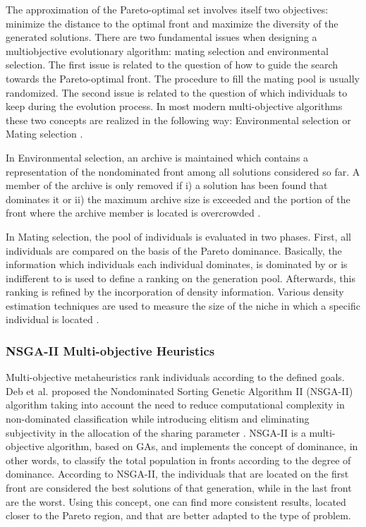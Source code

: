 \documentclass[espaco=umemeio,chapter=TITLE,twoside,openright]{abnt}
\begin{document}
The approximation of the Pareto-optimal set involves itself two objectives: minimize the distance to the optimal front and maximize the diversity of the generated solutions. There are two fundamental issues when designing a multiobjective evolutionary algorithm: mating selection and environmental selection. The first issue is related to the question of how to guide the search towards the Pareto-optimal front. The procedure to fill the mating pool is usually randomized. The second issue is related to the question of which individuals to keep during the evolution process. In most modern multi-objective algorithms these two concepts are realized in the following way: Environmental selection or Mating selection \cite{Zitzler2001}.

In  Environmental selection, an archive is maintained which contains a representation of the nondominated front among all solutions considered so far. A member of the archive is only removed if i) a solution has been found that dominates it or ii) the maximum archive size is exceeded and the portion of the front where the archive member is located is overcrowded \cite{Zitzler2001}.

In Mating selection, the pool of individuals is evaluated in two phases. First, all individuals are compared on the basis of the Pareto dominance. Basically, the information which individuals each individual dominates, is dominated by or is indifferent to is used to define a ranking on the generation pool. Afterwards, this ranking is refined by the incorporation of density information. Various density estimation techniques are used to measure the size of the niche in which a specific individual is located \cite{Zitzler2001}.


\subsubsection{NSGA-II Multi-objective Heuristics}


Multi-objective metaheuristics rank individuals according to the defined goals. Deb et al.  proposed the Nondominated Sorting Genetic Algorithm II (NSGA-II) algorithm taking into account the need to reduce computational complexity in non-dominated classification while introducing elitism and eliminating subjectivity in the allocation of the sharing parameter \cite{Deb2000}. NSGA-II is a multi-objective algorithm, based on GAs, and implements the concept of dominance, in other words, to classify the total population in fronts according to the degree of dominance. According to NSGA-II, the individuals that are located on the first front are considered the best solutions of that generation, while in the last front are the worst. Using this concept, one can find more consistent results, located closer to the Pareto region, and that are better adapted to the type of problem.
\end{document}
